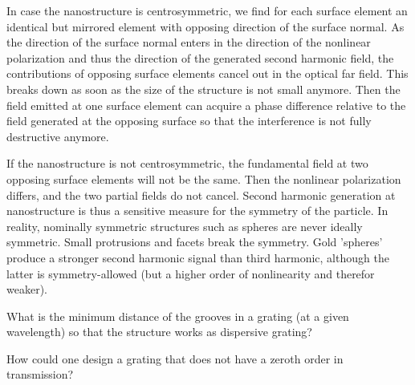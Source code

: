In case the nanostructure is centrosymmetric, we find for  each surface element  an identical but mirrored element with opposing direction of the surface normal. As the direction of the surface normal enters in the direction of the nonlinear polarization and thus the direction of the generated second harmonic field, the contributions of opposing surface elements cancel out in the optical far field. This breaks down as soon as the size of the structure is not small anymore. Then the field emitted at one surface element can acquire a phase difference relative to the field generated at the opposing surface so that the interference is not fully destructive anymore.

If the nanostructure is not centrosymmetric, the fundamental field at two opposing surface elements will not be the same. Then the nonlinear polarization differs, and the two partial fields do not cancel. Second harmonic generation at nanostructure is thus a sensitive measure for the symmetry of the particle. In reality, nominally symmetric structures such as spheres are never ideally symmetric. Small protrusions and facets break the symmetry. Gold 'spheres' produce a stronger second harmonic signal than third harmonic, although the latter is symmetry-allowed (but a higher order of nonlinearity and therefor weaker).




\begin{questions}
\item What is the minimum distance of the grooves in a grating (at a given wavelength) so that the structure works as dispersive grating?

\item How could one design a grating that does not have a zeroth order in transmission?

\end{questions}




\printbibliography[segment=\therefsegment,heading=subbibliography]
